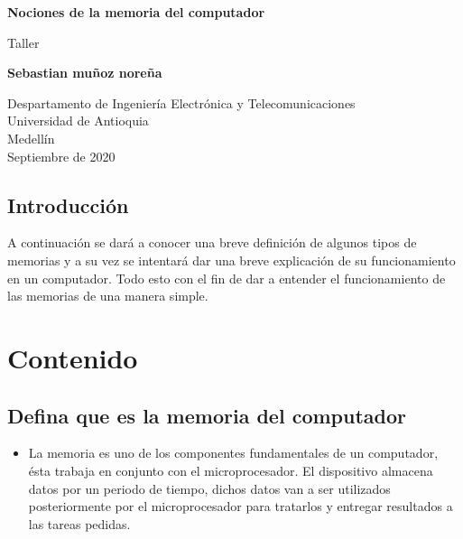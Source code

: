 \documentclass{article}
\begin{document}
\begin{titlepage}
    \begin{center}
        \vspace*{1cm}
            
        \Huge
        \textbf{Nociones de la memoria del computador}
            
        \vspace{0.5cm}
        \LARGE
        Taller
            
        \vspace{1.5cm}
            
        \textbf{Sebastian muñoz noreña}
            
        \vfill
            
        \vspace{0.8cm}
            
        \Large
        Despartamento de Ingeniería Electrónica y Telecomunicaciones\\
        Universidad de Antioquia\\
        Medellín\\
        Septiembre de 2020
            
    \end{center}
\end{titlepage}

\tableofcontents
\pagebreak
\begin{center}
    

\section{Introducción}\end{center}
A continuación se dará a conocer una breve definición de algunos tipos de memorias y a su vez se intentará dar una breve explicación de su funcionamiento en un computador. Todo esto con el fin de dar a entender el funcionamiento de las memorias de una manera simple.

\pagebreak


\section{Contenido} 
    \subsection{Defina que es la memoria del computador}
         \begin{itemize} \item{}
        La memoria es uno de los componentes fundamentales de un computador, ésta trabaja en conjunto con el microprocesador. El dispositivo almacena datos por un periodo de tiempo, dichos datos van a ser utilizados posteriormente por el microprocesador para tratarlos y entregar resultados a las tareas pedidas.\cite{Referencia}
        \end{itemize} 
\end{document}
